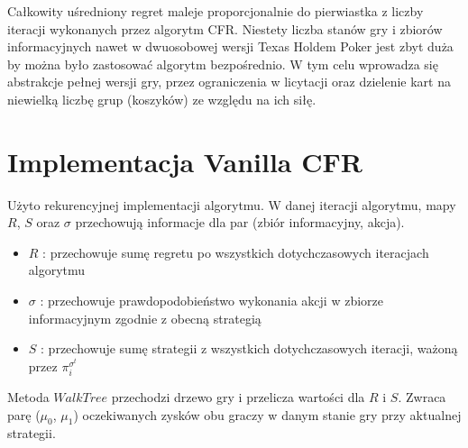 \documentclass[licencjacka]{pracamgr}
\begin{document}
\noindent
Całkowity uśredniony regret maleje proporcjonalnie do pierwiastka z liczby iteracji wykonanych przez algorytm CFR. Niestety
liczba stanów gry i zbiorów informacyjnych nawet w dwuosobowej wersji Texas Holdem Poker jest zbyt duża by można było
zastosować algorytm bezpośrednio. W tym celu wprowadza się abstrakcje pełnej wersji gry, przez ograniczenia w licytacji
oraz dzielenie kart na niewielką liczbę grup (koszyków) ze względu na ich siłę. \\

\section{Implementacja Vanilla CFR}

Użyto rekurencyjnej implementacji algorytmu. W danej iteracji algorytmu, mapy $R$, $S$ oraz $\sigma$ przechowują informacje
dla par (zbiór informacyjny, akcja).
\begin{itemize}
\item $R$ : przechowuje sumę regretu po wszystkich dotychczasowych iteracjach algorytmu
\item $\sigma$ : przechowuje prawdopodobieństwo wykonania akcji w zbiorze informacyjnym zgodnie z obecną strategią
\item $S$ : przechowuje sumę strategii z wszystkich dotychczasowych iteracji, ważoną przez $\pi_i^{\sigma^t}$
\end{itemize}

\noindent
Metoda $WalkTree$ przechodzi drzewo gry i przelicza wartości dla $R$ i $S$. Zwraca parę
($\mu_0$, $\mu_1$) oczekiwanych zysków obu graczy w danym stanie gry przy aktualnej strategii. \\\\

\end{document}
